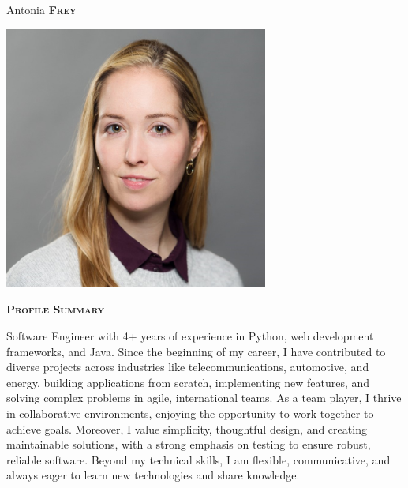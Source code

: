 \documentclass[10pt, a4paper]{article}
\newcommand{\headleft}[1]{\vspace*{3ex}\textsc{\textbf{#1}}\par%
    \vspace*{-1.5ex}\hrulefill\par\vspace*{0.7ex}}
\begin{document}
\setlength{\topskip}{0pt}
\setlength{\parindent}{0pt}
\setlength{\parskip}{0pt}
\setlength{\fboxsep}{0pt}
\pagestyle{empty}
\raggedbottom
{}

\begin{minipage}[t]{0.33\textwidth} 
\colorbox{cvblue}{\begin{minipage}[t][5mm][t]{\textwidth}\null\hfill\null\end{minipage}}

\vspace{-.2ex} 
\colorbox{cvblue!90}{\color{white}  
\textwidth\relax
\begin{minipage}[t][293mm][t]{0.82\textwidth}
\raggedright
\vspace*{2.5ex}

\Large Antonia \textbf{\textsc{Frey}} \normalsize 

\null\hfill\includegraphics[width=0.65\textwidth]{aaf.jpg}\hfill\null

\vspace*{0.5ex} 

\headleft{Profile Summary}
\parbox{1\textwidth}{
{\small
\justifying
\noindent
Software Engineer with 4+ years of experience in Python, web development frameworks, and Java. Since the beginning of my career, I have contributed to diverse projects across industries like telecommunications, automotive, and energy, building applications from scratch, implementing new features, and solving complex problems in agile, international teams. As a team player, I thrive in collaborative environments, enjoying the opportunity to work together to achieve goals. Moreover, I value simplicity, thoughtful design, and creating maintainable solutions, with a strong emphasis on testing to ensure robust, reliable software. Beyond my technical skills, I am flexible, communicative, and always eager to learn new technologies and share knowledge.
}}



\end{minipage}}
\end{minipage}
\end{document}
